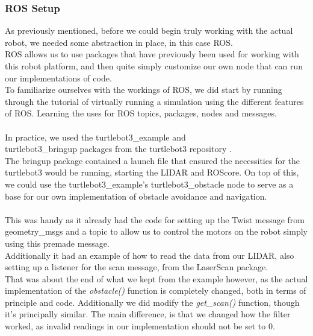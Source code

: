 \documentclass[conference]{IEEEtran}
\begin{document}
\subsubsection{ROS Setup}\label{ros}
As previously mentioned, before we could begin truly working with the actual robot, we needed some abstraction in place, 
in this case ROS.\\
ROS allows us to use packages that have previously been used for working with this robot platform, 
and then quite simply customize our own node that can run our implementations of code. \\
To familiarize ourselves with the workings of ROS, we did start by running through the tutorial of 
virtually running a simulation using the different features of ROS. Learning the uses for ROS topics, packages, 
nodes and messages.\\
\\
In practice, we used the turtlebot3\_example and \\turtlebot3\_bringup packages from the turtlebot3 repository \cite{b8}. \\
The bringup package contained a launch file that ensured the necessities for the turtlebot3 would be running, 
starting the LIDAR and ROScore. On top of this, we could use the turtlebot3\_example's turtlebot3\_obstacle node 
to serve as a base for our own implementation of obstacle avoidance and navigation.\\
\\
This was handy as it already had the code for setting up the Twist message from geometry\_msgs and a topic to allow 
us to control the motors on the robot simply using this premade message.\\
Additionally it had an example of how to read the data from our LIDAR, also setting up a listener for the scan message, 
from the LaserScan package.\\
That was about the end of what we kept from the example however, as the actual implementation of the \textit{obstacle()} function 
is completely changed, both in terms of principle and code. Additionally we did modify the \textit{get\_scan()} function, 
though it's principally similar. The main difference, is that we changed how the filter worked, as invalid readings 
in our implementation should not be set to 0.
\\\\
\end{document}
